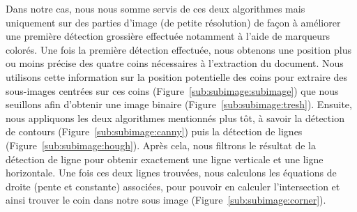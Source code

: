 Dans notre cas, nous nous somme servis de ces deux algorithmes mais uniquement sur des parties d'image (de petite résolution) de façon à améliorer une première détection grossière effectuée notamment à l'aide de marqueurs colorés. Une fois la première détection effectuée, nous obtenons une position plus ou moins précise des quatre coins nécessaires à l'extraction du document. Nous utilisons cette information sur la position potentielle des coins pour extraire des sous-images centrées sur ces coins (Figure~\ref{sub:subimage:subimage}) que nous seuillons afin d'obtenir une image binaire (Figure~\ref{sub:subimage:tresh}). Ensuite, nous appliquons les deux algorithmes mentionnés plus tôt, à savoir la détection de contours (Figure~\ref{sub:subimage:canny}) puis la détection de lignes (Figure~\ref{sub:subimage:hough}). Après cela, nous filtrons le résultat de la détection de ligne pour obtenir exactement une ligne verticale et une ligne horizontale. Une fois ces deux lignes trouvées, nous calculons les équations de droite (pente et constante) associées, pour pouvoir en calculer l'intersection et ainsi trouver le coin dans notre sous image (Figure~\ref{sub:subimage:corner}).

